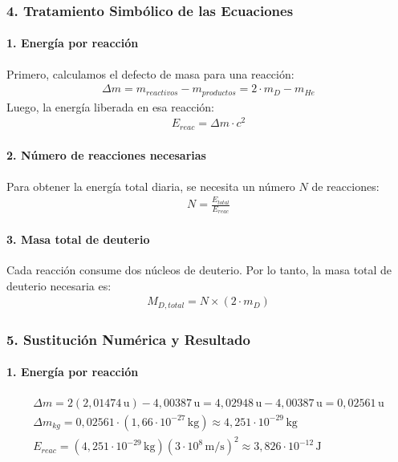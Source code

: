 \subsubsection*{4. Tratamiento Simbólico de las Ecuaciones}
\paragraph{1. Energía por reacción}
Primero, calculamos el defecto de masa para una reacción:
\begin{gather}
    \Delta m = m_{reactivos} - m_{productos} = 2 \cdot m_D - m_{He}
\end{gather}
Luego, la energía liberada en esa reacción:
\begin{gather}
    E_{reac} = \Delta m \cdot c^2
\end{gather}
\paragraph{2. Número de reacciones necesarias}
Para obtener la energía total diaria, se necesita un número $N$ de reacciones:
\begin{gather}
    N = \frac{E_{total}}{E_{reac}}
\end{gather}
\paragraph{3. Masa total de deuterio}
Cada reacción consume dos núcleos de deuterio. Por lo tanto, la masa total de deuterio necesaria es:
\begin{gather}
    M_{D, total} = N \times (2 \cdot m_D)
\end{gather}

\subsubsection*{5. Sustitución Numérica y Resultado}
\paragraph{1. Energía por reacción}
\begin{gather}
    \Delta m = 2(2,01474\,\text{u}) - 4,00387\,\text{u} = 4,02948\,\text{u} - 4,00387\,\text{u} = 0,02561\,\text{u} \\
    \Delta m_{kg} = 0,02561 \cdot (1,66 \cdot 10^{-27}\,\text{kg}) \approx 4,251 \cdot 10^{-29}\,\text{kg} \\
    E_{reac} = (4,251 \cdot 10^{-29}\,\text{kg})(3 \cdot 10^8\,\text{m/s})^2 \approx 3,826 \cdot 10^{-12}\,\text{J}
\end{gather}
